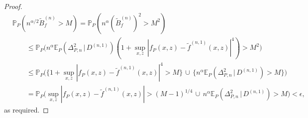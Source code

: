 \documentclass[aos]{imsart}
\newcommand{\pr}{\mathbb{P}}
\newcommand{\E}{\mathbb{E}}
\newcommand{\given}{\,|\,}
\begin{document}
\begin{proof}
\begin{align*}
			&\pr_P( n^{\alpha/2} \tilde{B}_f^{(n)} > M) =  \pr_P( n^{\alpha} (\tilde{B}_f^{(n)})^2 > M^2) \\
                &\qquad \leq \pr_P\Big(n^{\alpha}\E_P(\Delta_{P,n}^2 \given D^{(n,1)}) ( 1 + \sup_{x,z} |f_P(x,z)-\tilde f^{(n,1)}(x,z)|^{4}) > M^2 \Big)\\
                &\qquad \leq \pr_P\big( \big\{1 + \sup_{x,z} |f_P(x,z)-\tilde f^{(n,1)}(x,z)|^4 > M\big\}\, \cup \,  \big\{n^{\alpha} \E_P(\Delta_{P,n}^2 \given D^{(n,1)}) > M\big\} \big)\\
			&\qquad = \pr_P\big( \sup_{x,z} |f_P(x,z)-\tilde f^{(n,1)}(x,z)| > (M-1)^{1/4}\, \cup \,  n^{\alpha} \E_P(\Delta_{P,n}^2 \given D^{(n,1)}) > M \big) < \epsilon,
		\end{align*}
		as required.
	\end{proof}
	
\end{document}
